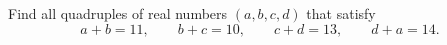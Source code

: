 Find all quadruples of real numbers $(a,b,c,d)$ that satisfy
\[a+b=11,\qquad b+c=10,\qquad c+d=13,\qquad d+a=14 .\]
